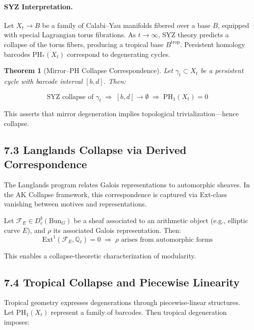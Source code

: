 \documentclass[11pt]{article}
\newtheorem{theorem}{Theorem}[section]
\begin{document}
\paragraph{SYZ Interpretation.}
Let \( X_t \to B \) be a family of Calabi–Yau manifolds fibered over a base \( B \), equipped with special Lagrangian torus fibrations.  
As \( t \to \infty \), SYZ theory predicts a collapse of the torus fibers, producing a tropical base \( B^{\mathrm{trop}} \).  
Persistent homology barcodes \( \mathrm{PH}_*(X_t) \) correspond to degenerating cycles.

\begin{theorem}[Mirror–PH Collapse Correspondence]
Let \( \gamma_t \subset X_t \) be a persistent cycle with barcode interval \( [b, d] \). Then:

\[
\text{SYZ collapse of } \gamma_t \;\Longrightarrow\; [b,d] \to \emptyset \;\Longrightarrow\; \mathrm{PH}_1(X_t) = 0
\]
\end{theorem}

This asserts that mirror degeneration implies topological trivialization—hence collapse.

\subsection*{7.3 Langlands Collapse via Derived Correspondence}

The Langlands program relates Galois representations to automorphic sheaves.  
In the AK Collapse framework, this correspondence is captured via Ext-class vanishing between motives and representations.

\begin{proposition}
Let \( \mathcal{F}_E \in D^b_c(\mathrm{Bun}_G) \) be a sheaf associated to an arithmetic object (e.g., elliptic curve \( E \)), and \( \rho \) its associated Galois representation.  
Then:
\[
\mathrm{Ext}^1(\mathcal{F}_E, \mathbb{Q}_\ell) = 0 \;\Longrightarrow\; \rho \text{ arises from automorphic forms}
\]

This enables a collapse-theoretic characterization of modularity.
\end{proposition}

\subsection*{7.4 Tropical Collapse and Piecewise Linearity}

Tropical geometry expresses degenerations through piecewise-linear structures.  
Let \( \mathrm{PH}_1(X_t) \) represent a family of barcodes. Then tropical degeneration imposes:
\end{document}
